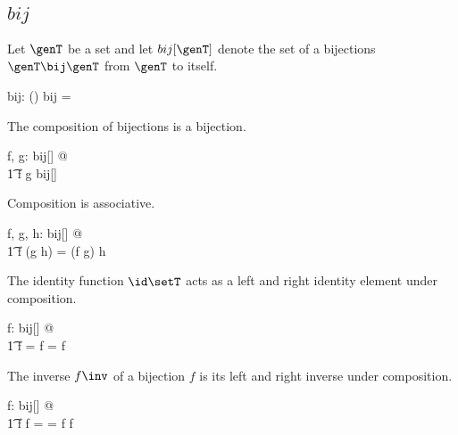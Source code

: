 \documentclass{amsart}
\begin{document}
\subsection{$bij$}

Let $\genT$ be a set and let $bij[\genT]$ denote the set of a bijections $\genT \bij \genT$ from $\genT$ to itself.

\begin{gendef}[\genT]
	bij: \power (\genT \fun \genT)
\where
	bij = \genT \bij \genT
\end{gendef}

\begin{remark}
The composition of bijections is a bijection.

\begin{zed}
	\forall f, g: bij[\setT] @ \\
	\t1	f \circ g \in bij[\setT]
\end{zed}

\end{remark}

\begin{remark}
Composition is associative.

\begin{zed}
	\forall f, g, h: bij[\setT] @ \\
	\t1	f \circ (g \circ h) = (f \circ g) \circ h
\end{zed}

\end{remark}

\begin{remark}
The identity function $\id \setT$ acts as a left and right identity element under composition.

\begin{zed}
	\forall f: bij[\setT] @ \\
	\t1	 \id \setT \circ f = f = f \circ \id \setT
\end{zed}

\end{remark}

\begin{remark}
The inverse $f \inv$ of a bijection $f$ is its left and right inverse under composition.

\begin{zed}
	\forall f: bij[\setT] @ \\
	\t1	f \circ f \inv = \id \setT = f \inv \circ f
\end{zed}

\end{remark}
\end{document}
